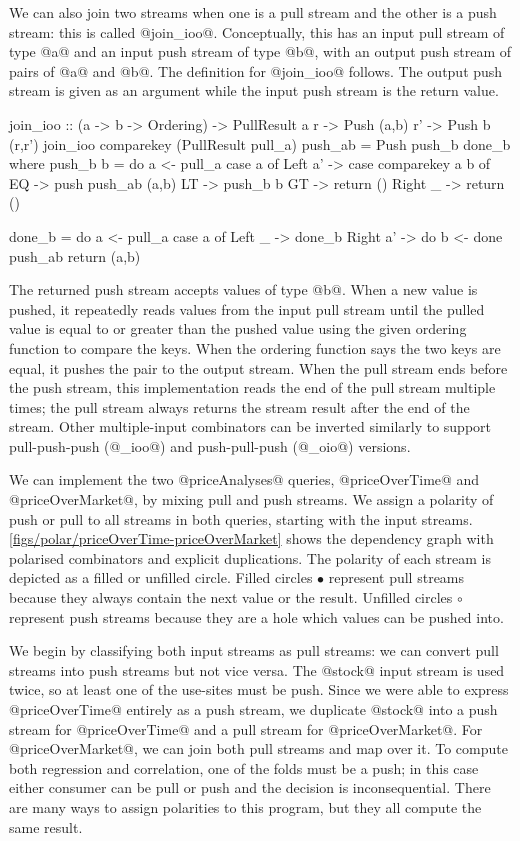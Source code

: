 We can also join two streams when one is a pull stream and the other is a push stream: this is called @join_ioo@.
Conceptually, this has an input pull stream of type @a@ and an input push stream of type @b@, with an output push stream of pairs of @a@ and @b@.
The definition for @join_ioo@ follows.
The output push stream is given as an argument while the input push stream is the return value.

\begin{haskell}
join_ioo :: (a -> b -> Ordering)
         -> PullResult a r
         -> Push (a,b) r'
         -> Push b (r,r')
join_ioo comparekey (PullResult pull_a) push_ab = Push push_b done_b
 where
  push_b b = do
    a <- pull_a
    case a of
     Left a' -> case comparekey a b of
      EQ -> push push_ab (a,b)
      LT -> push_b b
      GT -> return ()
     Right _ -> return () 

  done_b = do
    a <- pull_a
    case a of
     Left _ -> done_b
     Right a' -> do
      b <- done push_ab
      return (a,b)
\end{haskell}

The returned push stream accepts values of type @b@.
When a new value is pushed, it repeatedly reads values from the input pull stream until the pulled value is equal to or greater than the pushed value using the given ordering function to compare the keys.
When the ordering function says the two keys are equal, it pushes the pair to the output stream.
When the pull stream ends before the push stream, this implementation reads the end of the pull stream multiple times; the pull stream always returns the stream result after the end of the stream.
Other multiple-input combinators can be inverted similarly to support pull-push-push (@_ioo@) and push-pull-push (@_oio@) versions.

We can implement the two @priceAnalyses@ queries, @priceOverTime@ and @priceOverMarket@, by mixing pull and push streams.
We assign a polarity of push or pull to all streams in both queries, starting with the input streams.
\autoref{figs/polar/priceOverTime-priceOverMarket} shows the dependency graph with polarised combinators and explicit duplications.
The polarity of each stream is depicted as a filled or unfilled circle.
Filled circles $\bullet$ represent pull streams because they always contain the next value or the result.
Unfilled circles $\circ$ represent push streams because they are a hole which values can be pushed into.

We begin by classifying both input streams as pull streams: we can convert pull streams into push streams but not vice versa.
The @stock@ input stream is used twice, so at least one of the use-sites must be push.
Since we were able to express @priceOverTime@ entirely as a push stream, we duplicate @stock@ into a push stream for @priceOverTime@ and a pull stream for @priceOverMarket@.
For @priceOverMarket@, we can join both pull streams and map over it.
To compute both regression and correlation, one of the folds must be a push; in this case either consumer can be pull or push and the decision is inconsequential.
There are many ways to assign polarities to this program, but they all compute the same result.

